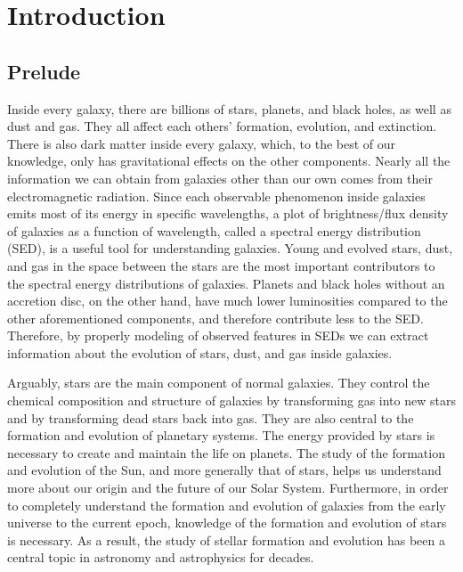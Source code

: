 
\chapter{Introduction}
\label{chap:intro}

\section{Prelude}
\label{sec: overview}
Inside every galaxy, there are billions of stars, planets, and black holes, as well as dust and gas.
They all affect each others' formation, evolution, and extinction.
There is also dark matter inside every galaxy, which, to the best of our knowledge, only has gravitational effects on the other components.
Nearly all the information we can obtain from galaxies other than our own comes from their electromagnetic radiation.
Since each observable phenomenon inside galaxies emits most of its energy in specific wavelengths, 
a plot of brightness/flux density of galaxies as a function of wavelength, called a spectral energy distribution (SED), is a useful tool for understanding galaxies. 
Young and evolved stars, dust, and gas in the space between the stars are the most important contributors to the spectral energy distributions of galaxies.
Planets and black holes without an accretion disc, on the other hand, have much lower luminosities compared to the other aforementioned components, and therefore contribute less to the SED.
Therefore, by properly modeling of observed features in SEDs we can extract information about the evolution of stars, dust, and gas inside galaxies.

Arguably, stars are the main component of normal galaxies.
They control the chemical composition and structure of galaxies by transforming gas into new stars and by transforming dead stars back into gas.
They are also central to the formation and evolution of planetary systems.
The energy provided by stars is necessary to create and maintain the life on planets. 
The study of the formation and evolution of the Sun, and more generally that of stars, helps us understand more about our origin and the future of our Solar System.
Furthermore, in order to completely understand the formation and evolution of galaxies from the early universe to the current epoch, knowledge of the formation and evolution of stars is necessary. 
As a result, the study of stellar formation and evolution has been a central topic in astronomy and astrophysics for decades.

